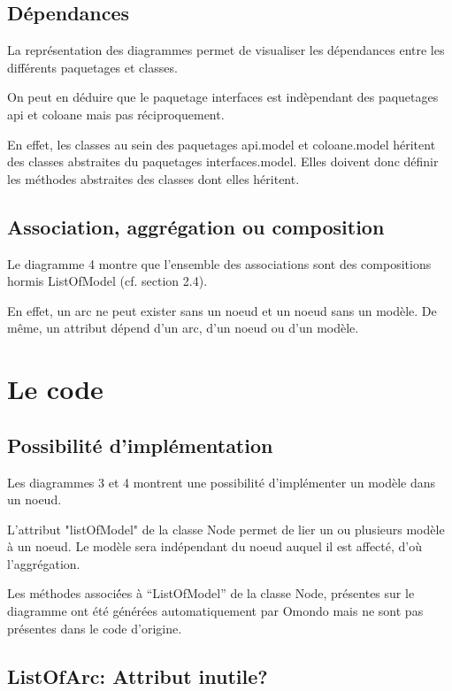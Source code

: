\documentclass{article}
\begin{document}
\subsection{D\'ependances}

La repr\'esentation des diagrammes permet de visualiser les d\'ependances entre les diff\'erents paquetages et classes.

On peut en d\'eduire que le paquetage interfaces est ind\`ependant des paquetages api et coloane mais pas r\'eciproquement.

En effet, les classes au sein des paquetages api.model et coloane.model h\'eritent des classes abstraites du paquetages interfaces.model.
Elles doivent donc d\'efinir les m\'ethodes abstraites des classes dont elles h\'eritent.



\subsection{Association, aggr\'egation ou composition}

Le diagramme 4 montre que l'ensemble des associations sont des compositions hormis ListOfModel (cf. section 2.4).

En effet, un arc ne peut exister sans un noeud et un noeud sans un mod\`ele.
De m\^eme, un attribut d\'epend d'un arc, d'un noeud ou d'un mod\`ele.


\section{Le code}
\subsection{Possibilit\'e d'impl\'ementation}

Les diagrammes 3 et 4 montrent une possibilit\'e d'impl\'ementer un mod\`ele dans un noeud.

L'attribut "listOfModel" de la classe Node permet de lier un ou plusieurs mod\`ele \`a un noeud.
Le mod\`ele sera ind\'ependant du noeud auquel il est affect\'e, d'o\`u l'aggr\'egation.	

Les m\'ethodes associ\'ées \`a ``ListOfModel'' de la classe Node, pr\'esentes sur le diagramme ont \'et\'e g\'en\'er\'ees automatiquement par Omondo mais ne sont pas pr\'esentes dans le code d'origine.



\subsection{ListOfArc: Attribut inutile?}
\end{document}
